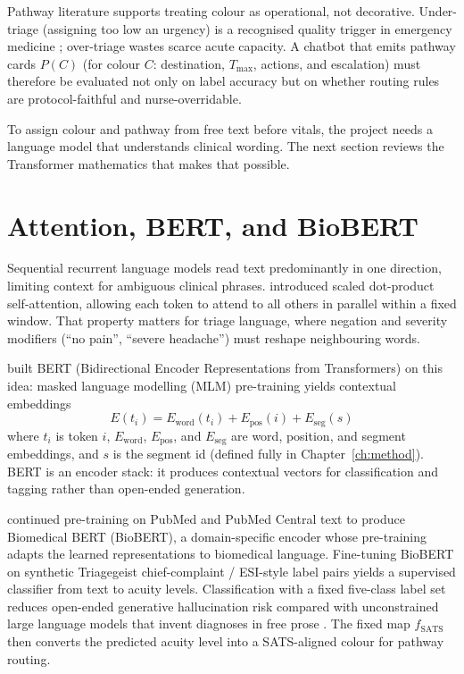 Pathway literature supports treating colour as operational, not decorative. Under-triage (assigning too low an urgency) is a recognised quality trigger in emergency medicine \citep{Berkowitz2019}; over-triage wastes scarce acute capacity. A chatbot that emits pathway cards \(P(C)\) (for colour \(C\): destination, \(T_{\max}\), actions, and escalation) must therefore be evaluated not only on label accuracy but on whether routing rules are protocol-faithful and nurse-overridable.

To assign colour and pathway from free text before vitals, the project needs a language model that understands clinical wording. The next section reviews the Transformer mathematics that makes that possible.

\section{Attention, BERT, and BioBERT}

Sequential recurrent language models read text predominantly in one direction, limiting context for ambiguous clinical phrases. \citet{vaswani2017attention} introduced scaled dot-product self-attention, allowing each token to attend to all others in parallel within a fixed window. That property matters for triage language, where negation and severity modifiers (``no pain'', ``severe headache'') must reshape neighbouring words.

\citet{devlin2019bert} built BERT (Bidirectional Encoder Representations from Transformers) on this idea: masked language modelling (MLM) pre-training yields contextual embeddings
\[
  E(t_i) = E_{\mathrm{word}}(t_i) + E_{\mathrm{pos}}(i) + E_{\mathrm{seg}}(s)
\]
where \(t_i\) is token \(i\), \(E_{\mathrm{word}}\), \(E_{\mathrm{pos}}\), and \(E_{\mathrm{seg}}\) are word, position, and segment embeddings, and \(s\) is the segment id (defined fully in Chapter~\ref{ch:method}). BERT is an encoder stack: it produces contextual vectors for classification and tagging rather than open-ended generation.

\citet{lee2020biobert} continued pre-training on PubMed and PubMed Central text to produce Biomedical BERT (BioBERT), a domain-specific encoder whose pre-training adapts the learned representations to biomedical language. Fine-tuning BioBERT on synthetic Triagegeist chief-complaint / ESI-style label pairs yields a supervised classifier from text to acuity levels. Classification with a fixed five-class label set reduces open-ended generative hallucination risk compared with unconstrained large language models that invent diagnoses in free prose \citep{stewart2023nlp}. The fixed map \(f_{\mathrm{SATS}}\) then converts the predicted acuity level into a SATS-aligned colour for pathway routing.

